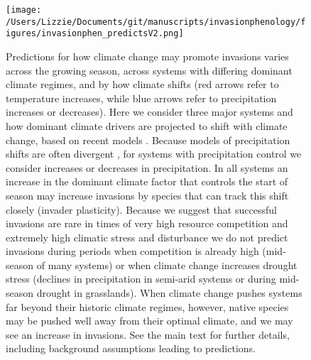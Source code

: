 \documentclass[11pt,a4paper,oneside]{article}
\begin{document}
\newpage
\begin{figure}[h!]
\centering \texttt{[image: /Users/Lizzie/Documents/git/manuscripts/invasionphenology/figures/invasionphen\_predictsV2.png]}
\caption{Predictions for how climate change may promote invasions varies across the growing season, across systems with differing dominant climate regimes, and by how climate shifts (red arrows refer to temperature increases, while blue arrows refer to precipitation increases or decreases). Here we consider three major systems and how dominant climate drivers are projected to shift with climate change, based on recent models \citep{knutti2013}. Because models of precipitation shifts are often divergent \citep{knutti2013}, for systems with precipitation control we consider increases or decreases in precipitation. In all systems an increase in the dominant climate factor that controls the start of season may increase invasions by species that can track this shift closely (invader plasticity). Because we suggest that successful invasions are rare in times of very high resource competition and extremely high climatic stress and disturbance we do not predict invasions during periods when competition is already high (mid-season of many systems) or when climate change increases drought stress (declines in precipitation in semi-arid systems or during mid-season drought in grasslands). When climate change pushes systems far beyond their historic climate regimes, however, native species may be pushed well away from their optimal climate, and we may see an increase in invasions. See the main text for further details, including background assumptions leading to predictions.}
\end{figure}
\end{document}
